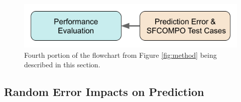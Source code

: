 
\begin{figure}[H]
  \centering
  \includegraphics[width=0.7\linewidth]{./chapters/exp1/methodology4.png}
  \caption{Fourth portion of the flowchart from Figure \ref{fig:method} being 
           described in this section.}
\end{figure}

\subsection{Random Error Impacts on Prediction}
\label{sec:randerr}

